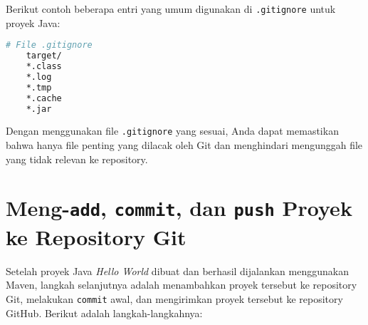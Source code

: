 Berikut contoh beberapa entri yang umum digunakan di \texttt{.gitignore} untuk proyek Java:
\begin{lstlisting}[language=bash]
	# File .gitignore
	target/
	*.class
	*.log
	*.tmp
	*.cache
	*.jar
\end{lstlisting}

Dengan menggunakan file \texttt{.gitignore} yang sesuai, Anda dapat memastikan bahwa hanya file penting yang dilacak oleh Git dan menghindari mengunggah file yang tidak relevan ke repository.

\section{Meng-\texttt{add}, \texttt{commit}, dan \texttt{push} Proyek ke Repository Git}

Setelah proyek Java \textit{Hello World} dibuat dan berhasil dijalankan menggunakan Maven, langkah selanjutnya adalah menambahkan proyek tersebut ke repository Git, melakukan \texttt{commit} awal, dan mengirimkan proyek tersebut ke repository GitHub. Berikut adalah langkah-langkahnya:

